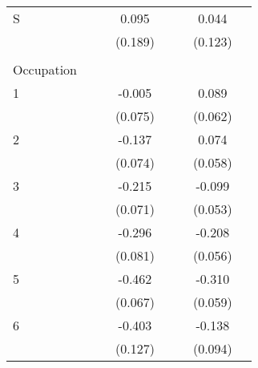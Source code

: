 \begin{longtable}{l*{3}{c}|l*{3}{c}}
	S                   &                     &                     &       0.095         &                     &                     &       0.044         \\
	&                     &                     &     (0.189)         &                     &                     &     (0.123)         \\
	&&&&&&&\\
	Occupation &&&&&&\\
	1                   &                     &                     &      -0.005         &                     &                     &       0.089         \\
	&                     &                     &     (0.075)         &                     &                     &     (0.062)         \\
	2                   &                     &                     &      -0.137\sym{*}  &                     &                     &       0.074         \\
	&                     &                     &     (0.074)         &                     &                     &     (0.058)         \\
	3                   &                     &                     &      -0.215\sym{***}&                     &                     &      -0.099\sym{*}  \\
	&                     &                     &     (0.071)         &                     &                     &     (0.053)         \\
	4                   &                     &                     &      -0.296\sym{***}&                     &                     &      -0.208\sym{***}\\
	&                     &                     &     (0.081)         &                     &                     &     (0.056)         \\
	5                   &                     &                     &      -0.462\sym{***}&                     &                     &      -0.310\sym{***}\\
	&                     &                     &     (0.067)         &                     &                     &     (0.059)         \\
	6                   &                     &                     &      -0.403\sym{***}&                     &                     &      -0.138         \\
	&                     &                     &     (0.127)         &                     &                     &     (0.094)         \\

\end{longtable}
